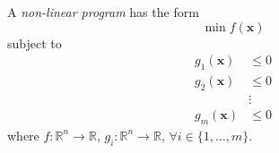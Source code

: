 \begin{defbox}
    \begin{definition}
        A \emph{non-linear program} has the form
        \[\min f(\bm{x})\]
        subject to
        \begin{align*}
            g_1(\bm{x}) & \leqslant 0 \\
            g_2(\bm{x}) & \leqslant 0 \\
                        & \vdots      \\
            g_m(\bm{x}) & \leqslant 0
        \end{align*}
        where
        $f:\mathbb{R}^n\rightarrow \mathbb{R}$,
        $g_i:\mathbb{R}^n\rightarrow\mathbb{R}$, $\forall i\in\{1,\dots,m\}$.
    \end{definition}
\end{defbox}

